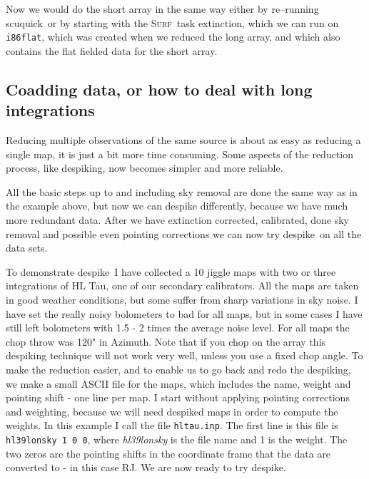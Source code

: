 \documentclass[twoside,11pt]{article}
\newcommand{\surf}{\xref{\textsc{Surf}}{sun216}{}}
\newcommand{\task}[1]{\textsf{#1}}
\newcommand{\desp}{\xref{\task{despike}}{sun216}{DESPIKE}}
\newcommand{\ext}{\xref{\task{extinction}}{sun216}{EXTINCTION}}
\newcommand{\scuquick}{\xref{\task{scuquick}}{sun216}{SCUQUICK}}
\newcommand{\xref}[3]{#1}
\newcommand{\xlabel}[1]{}
\renewcommand{\_}{\texttt{\symbol{95}}}
\begin{document}
Now we would do the short array in the same way either by re--running
\scuquick\ or by starting with the \surf\ task \ext, which we can run
on \texttt{i86\_flat}, which was created when we reduced the long
array, and which also contains the flat fielded data for the short
array.

\subsection{\xlabel{Coadding data}Coadding data, or how to deal with long integrations}

Reducing multiple observations of the same source is about as easy as
reducing a single map, it is just a bit more time consuming. Some
aspects of the reduction process, like despiking, now becomes simpler
and more reliable.

All the basic steps up to and including sky removal are done the same way as
in the example above, but now we can despike differently, because we have
much more redundant data. After we have extinction corrected, calibrated,
done sky removal and possible even pointing corrections we can now try 
\desp\ on all the data sets.

To demonstrate \desp\ I have collected a 10 jiggle maps with two or
three integrations of HL Tau, one of our secondary calibrators.  All
the maps are taken in good weather conditions, but some suffer from
sharp variations in sky noise. I have set the really noisy bolometers
to bad for all maps, but in some cases I have still left bolometers
with 1.5 - 2 times the average noise level. For all maps the chop throw
was 120" in Azimuth. Note that if you chop on the array this despiking
technique will not work very well, unless you use a fixed chop angle.
To make the reduction easier, and to enable us to go back and redo the
despiking, we make a small ASCII file for the maps, which includes the
name, weight and pointing shift - one line per map. I start without
applying pointing corrections and weighting, because we will need
despiked maps in order to compute the weights. In this example I call
the file \texttt{hltau.inp}. The first line is this file is
\texttt{hl39\_lon\_sky 1 0 0}, where {\it hl39\_lon\_sky} is the file
name and 1 is the weight. The two zeros are the pointing shifts in the
coordinate frame that the data are converted to - in this case RJ. We
are now ready to try \desp.
\end{document}
